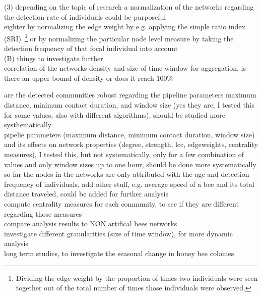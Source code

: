 (3) depending on the topic of research a normalization of the networks regarding the detection rate of individuals could be purposeful\\
eighter by normalizing the edge weight by e.g. applying the simple ratio index (SRI)~\footnote{Dividing the edge weight by the proportion of times two individuals were seen
together out of the total number of times those individuals were observed.} 
or by normalizing the particular node level measure by taking the detection frequency of that focal individual into account\\


(B) things to investigate further\\

correlation of the networks density and size of time window for aggregation, is there an upper bound of density or does it reach 100\%

are the detected communities robust regarding the pipeline parameters maximum distance, minimum contact duration, and window size (yes they are, I tested this for some values, also with different algorithms), should be studied more systhematically\\

pipelie parameters (maximum distance, minimum contact duration, window size) and its effects on network properties (degree, strength, lcc, edgeweights, centrality measures), I tested this, but not systematically, only for a few combination of values and only window sizes up to one hour, should be done more systematically\\

so far the nodes in the networks are only attributed with the age and detection frequency of individuals, add other stuff, e.g. average speed of a bee and its total distance traveled, could be added for further analysis\\

compute centrality measures for each community, to see if they are different regarding those measures\\

compare analysis results to NON artifical bees networks\\

investigate different granularities (size of time window), for more dynamic analysis\\

long term studies, to investigate the seasonal change in honey bee colonies\\


